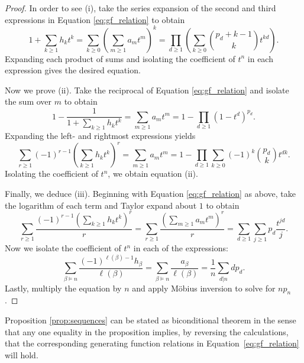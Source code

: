 \documentclass[11pt]{amsart}
\theoremstyle{definition}
\newtheorem{remark}[theorem]{Remark}
\numberwithin{equation}{section}
\begin{document}
\begin{proof}

In order to see (i), take the series expansion of the second
and third expressions in Equation \eqref{eq:gf_relation} to obtain
\begin{equation}\label{eq:gf_relation_reciprocal}
1 + \sum_{k \geq 1} h_k t^k
= \sum_{k \geq 0} \left(\sum_{m \geq 1} a_m t^m\right)^k
= \prod_{d \geq 1} \left(\sum_{k \geq 0} \binom{p_d+k-1}{k} t^{kd}\right).
\end{equation}
Expanding each product of sums and isolating the coefficient of $t^{n}$ in each expression gives the desired equation.

Now we prove (ii).  Take the reciprocal of Equation \eqref{eq:gf_relation}
and isolate the sum over $m$ to obtain
\[
1 - \frac{1}{1 + \sum_{k \geq 1} h_k t^k} 
= \sum_{m \geq 1} a_m t^m 
= 1 - \prod_{d \geq 1} (1-t^d)^{p_d}.
\]
Expanding the left- and rightmost expressions yields
\[
\sum_{r \geq 1} (-1)^{r-1} \left(\sum_{k \geq 1} h_k t^k\right)^r
= \sum_{m \geq 1} a_m t^m
= 1 - \prod_{d \geq 1} \sum_{k \geq 0} (-1)^k \binom{p_d}{k} t^{dk}.
\]
Isolating the coefficient of $t^{n}$, we obtain equation (ii).

Finally, we deduce (iii).  Beginning with Equation \eqref{eq:gf_relation} as above,
take the logarithm of each term and Taylor expand about $1$ to obtain
%
\[
 \sum_{r \geq 1} \frac{(-1)^{r-1}(\sum_{k \geq 1} h_k t^k )^r}{r}
= \sum_{r \geq 1} \frac{(\sum_{m \geq 1} a_m t^m )^r}{r}
= \sum_{d \geq 1} \sum_{j \geq 1} p_d \frac{t^{jd}}{j}.
\]
Now we isolate the coefficient of $t^{n}$ in each of the expressions: 
\[
\sum_{\beta \vDash n} \frac{(-1)^{\ell(\beta)-1} h_\beta}{\ell(\beta)}
= \sum_{\beta \vDash n} \frac{a_\beta}{\ell(\beta)}
= \frac{1}{n} \sum_{d | n} d p_{d} .
\]
Lastly, multiply the equation by $n$ and apply M\"{o}bius inversion to solve for $n p_{n}$.
\end{proof}

Proposition \ref{prop:sequences} can be stated as biconditional theorem in the sense
that any one equality in the proposition implies, by reversing the calculations,
that the corresponding generating function relations in Equation~\eqref{eq:gf_relation}
will hold.
\end{document}
